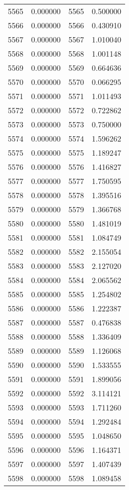\documentclass[12pt]{article}
\begin{document}
\begin{longtable}{@{}cccc@{}}
5565 & 0.000000 & 5565 & 0.500000 \\
5566 & 0.000000 & 5566 & 0.430910 \\
5567 & 0.000000 & 5567 & 1.010040 \\
5568 & 0.000000 & 5568 & 1.001148 \\
5569 & 0.000000 & 5569 & 0.664636 \\
5570 & 0.000000 & 5570 & 0.066295 \\
5571 & 0.000000 & 5571 & 1.011493 \\
5572 & 0.000000 & 5572 & 0.722862 \\
5573 & 0.000000 & 5573 & 0.750000 \\
5574 & 0.000000 & 5574 & 1.596262 \\
5575 & 0.000000 & 5575 & 1.189247 \\
5576 & 0.000000 & 5576 & 1.416827 \\
5577 & 0.000000 & 5577 & 1.750595 \\
5578 & 0.000000 & 5578 & 1.395516 \\
5579 & 0.000000 & 5579 & 1.366768 \\
5580 & 0.000000 & 5580 & 1.481019 \\
5581 & 0.000000 & 5581 & 1.084749 \\
5582 & 0.000000 & 5582 & 2.155054 \\
5583 & 0.000000 & 5583 & 2.127020 \\
5584 & 0.000000 & 5584 & 2.065562 \\
5585 & 0.000000 & 5585 & 1.254802 \\
5586 & 0.000000 & 5586 & 1.222387 \\
5587 & 0.000000 & 5587 & 0.476838 \\
5588 & 0.000000 & 5588 & 1.336409 \\
5589 & 0.000000 & 5589 & 1.126068 \\
5590 & 0.000000 & 5590 & 1.533555 \\
5591 & 0.000000 & 5591 & 1.899056 \\
5592 & 0.000000 & 5592 & 3.114121 \\
5593 & 0.000000 & 5593 & 1.711260 \\
5594 & 0.000000 & 5594 & 1.292484 \\
5595 & 0.000000 & 5595 & 1.048650 \\
5596 & 0.000000 & 5596 & 1.164371 \\
5597 & 0.000000 & 5597 & 1.407439 \\
5598 & 0.000000 & 5598 & 1.089458 \\

\end{longtable}
\end{document}
